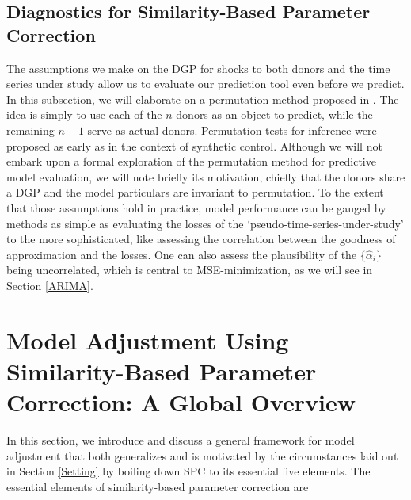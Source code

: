 \documentclass{uiucthesis2021}
\theoremstyle{definition}
\begin{document}
  \subsection{Diagnostics for Similarity-Based Parameter Correction}
  The assumptions we make on the DGP for shocks to both donors and the time series under study allow us to evaluate our prediction tool even before we predict.  In this subsection, we will elaborate on a permutation method proposed in \cite[][]{lin2021minimizing}.  The idea is simply to use each of the $n$ donors as an object to predict, while the remaining $n-1$ serve as actual donors.  Permutation tests for inference were proposed as early as \cite[][]{abadie2010synthetic} in the context of synthetic control.  Although we will not embark upon a formal exploration of the permutation method for predictive model evaluation, we will note briefly its motivation, chiefly that the donors share a DGP and the model particulars are invariant to permutation.  To the extent that those assumptions hold in practice, model performance can be gauged by methods as simple as evaluating the losses of the `pseudo-time-series-under-study' to the more sophisticated, like assessing the correlation between the goodness of approximation and the losses.  One can also assess the plausibility of the $\{\hat\alpha_{i}\}$ being uncorrelated, which is central to MSE-minimization, as we will see in Section \ref{ARIMA}.
  
  \section{Model Adjustment Using Similarity-Based Parameter Correction: A Global Overview}\label{global_overview}
  
  In this section, we introduce and discuss a general framework for model adjustment that both generalizes and is motivated by the circumstances laid out in Section \ref{Setting} by boiling down SPC to its essential five elements.  The essential elements of similarity-based parameter correction are
  
\end{document}
